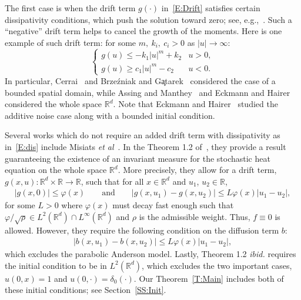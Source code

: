 \documentclass[sn-mathphys]{sn-jnl}%
\renewcommand{\R}{\mathbb{R}}
\numberwithin{equation}{section}
\theoremstyle{thmstyleone}%
\theoremstyle{thmstyletwo}%
\theoremstyle{thmstylethree}%
\begin{document}
The first case is when the drift term $g(\cdot)$ in~\eqref{E:Drift} satisfies certain dissipativity
conditions, which push the solution toward zero; see, e.g.,~\cite{assing.manthey:03:invariant,
brzezniak.gatarek:99:martingale, cerrai:01:second, cerrai:03:stochastic,
eckmann.hairer:01:invariant}. Such a ``negative'' drift term helps to cancel the growth of the
moments. Here is one example of such drift term: for some $m,\: k_i, \: c_i>0$ as $\lvert u \rvert \to \infty$:
\begin{equation}\label{E:dis}
  \begin{cases}
    g(u) \le -k_1\lvert u \rvert^m + k_2 & u > 0, \\
    g(u) \ge c_1\lvert u \rvert^m - c_2  & u < 0.
  \end{cases}
\end{equation}
In particular, Cerrai~\cite{cerrai:01:second, cerrai:03:stochastic} and Brze\'{z}niak and
G\c{a}tarek~\cite{brzezniak.gatarek:99:martingale} considered the case of a bounded spatial domain,
while Assing and Manthey~\cite{assing.manthey:03:invariant} and Eckmann and
Hairer~\cite{eckmann.hairer:01:invariant} considered the whole space $\R^d$. Note that Eckmann and
Hairer~\cite{eckmann.hairer:01:invariant} studied the additive noise case along with a bounded
initial condition.

Several works which do not require an added drift term with dissipativity as in~\eqref{E:dis}
include Misiats \textit{et
al}~\cite{misiats.stanzhytskyi.ea:16:existence,misiats.stanzhytskyi.ea:20:invariant}. In the Theorem
1.2 of~\cite{misiats.stanzhytskyi.ea:20:invariant}, they provide a result guaranteeing the existence
of an invariant measure for the stochastic heat equation on the whole space $\R^d$. More precisely,
they allow for a drift term, $g(x,u):\R^d \times \R \to \R$, such that for all $x \in \R^d$ and
$u_1$, $u_2 \in \R$,
\begin{align*}
		\lvert g(x,0) \rvert \le \varphi(x) \qquad \text{and} \qquad
    \lvert g(x,u_1) - g(x,u_2) \rvert \le L\varphi(x) \lvert u_1 - u_2 \rvert,
\end{align*}
for some $L>0$ where $\varphi(x)$ must decay fast enough such that $\varphi / \sqrt{\rho} \in
L^2 (\R^d) \cap L^{\infty}(\R^d)$ and $\rho$ is the admissible weight. Thus, $f \equiv 0$ is allowed.
However, they require the following condition on the diffusion term $b$:
\begin{align*}
  \lvert b(x,u_1) - b(x,u_2)\rvert \le L\varphi(x) \lvert u_1 - u_2 \rvert,
\end{align*}
which excludes the parabolic Anderson model. Lastly, Theorem 1.2 \textit{ibid.} requires the initial
condition to be in $L^2 (\R^d)$, which excludes the two important cases, $u(0,x) = 1$ and
$u(0,\cdot) = \delta_0(\cdot)$. Our Theorem~\ref{T:Main} includes both of these initial conditions;
see Section~\ref{SS:Init}.
\end{document}
